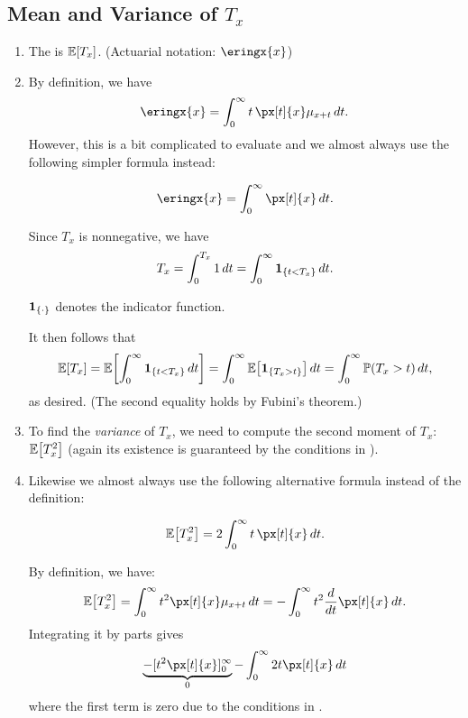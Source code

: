 \subsection{Mean and Variance of \(T_x\)}
\begin{enumerate}
\item The  is \(\mathbb{E}\qty[T_x]\). (Actuarial
notation: \(\eringx{x}\))


\item By definition, we have
\[
\eringx{x}=\int_{0}^{\infty}t\,\px[t]{x}\mu_{x+t}\,dt.
\]
However, this is a bit complicated to evaluate and we almost always use the
following simpler formula instead:
\begin{proposition}
\label{prp:eringx-fmla}
\[
\eringx{x}=\int_0^{\infty}\px[t]{x}\,dt.
\]
\end{proposition}

\begin{pf}
Since \(T_x\) is nonnegative, we have
\[
T_x=\int_{0}^{T_x}1\,dt
=\int_{0}^{\infty}\mathbf{1}_{\left\{t<T_x\right\}}\,dt.
\]
\begin{note}
\(\mathbf{1}_{\left\{\cdot\right\}}\) denotes the indicator function.
\end{note}

It then follows that
\[
\mathbb{E}\qty[T_x]=\mathbb{E}\qty[\int_{0}^{\infty}\mathbf{1}_{\left\{t<T_x\right\}}\,dt]
=\int_{0}^{\infty}\mathbb{E}\qty[\mathbf{1}_{\left\{T_x>t\right\}}]\,dt
=\int_{0}^{\infty}\mathbb{P}\qty(T_x>t)\,dt,
\]
as desired. (The second equality holds by Fubini's theorem.)
\end{pf}

\item To find the \emph{variance} of \(T_x\), we need to compute the second
moment of \(T_x\): \(\mathbb{E}\qty[T_x^2]\) (again its existence is guaranteed by the
conditions in ).
\item Likewise we almost always use the following alternative formula instead
of the definition:
\begin{proposition}
\label{prp:tx-2nd-moment-fmla}
\[
\expv{T_x^2}=2\int_{0}^{\infty}t\,\px[t]{x}\,dt.
\]
\end{proposition}
\begin{pf}
By definition, we have:
\[
\expv{T_x^2}=\int_{0}^{\infty}t^2\px[t]{x}\mu_{x+t}\,dt
=-\int_{0}^{\infty}t^2\frac{d}{dt}\px[t]{x}\,dt.
\]
Integrating it by parts gives
\[
\underbrace{-[t^2\px[t]{x}]_0^{\infty}}_{0}-\int_{0}^{\infty}2t\px[t]{x}\,dt
\]
where the first term is zero due to the conditions in
.
\end{pf}


\end{enumerate}

